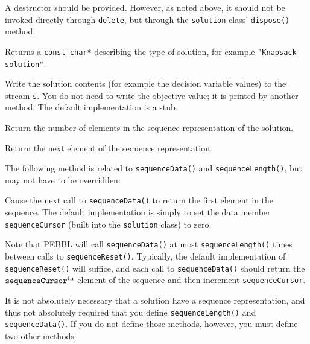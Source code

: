 A destructor should be provided.  However, as noted above, it should not be
invoked directly through \texttt{delete}, but through the \texttt{solution}
class' \texttt{dispose()} method.

 Returns a \texttt{const
  char*} describing the type of solution, for example
\texttt{"Knapsack solution"}.

 Write the
solution contents (for example the decision variable values) to the stream
\texttt{s}.  You do not need to write the objective value; it is
printed by another method.  The default implementation is a stub.

  Return the number of
elements in the sequence representation of the solution.  

 Return the next element of the
sequence representation.

\vspace{2ex}

The following method is related to \texttt{sequenceData()} and
\texttt{sequenceLength()}, but may not have to be overridden:

\vspace{2ex}

 Cause the next call to
\texttt{sequenceData()} to return the first element in the sequence.
The default implementation is simply to set the data member
\texttt{sequenceCursor} (built into the \texttt{solution} class) to
zero.

\vspace{2ex}

Note that PEBBL will call \texttt{sequenceData()} at most
\texttt{sequenceLength()} times between calls to
\texttt{sequenceReset()}.  Typically, the default implementation of
\texttt{sequenceReset()} will suffice, and each call to
\texttt{sequenceData()} should return the
$\text{\texttt{sequenceCursor}}^\text{th}$ element of the sequence and
then increment \texttt{sequenceCursor}.

It is not absolutely necessary that a solution have a sequence
representation, and thus not absolutely required that you define
\texttt{sequenceLength()} and \texttt{sequenceData()}.  If you do not
define those methods, however, you must define two other methods:

\vspace{2ex}

